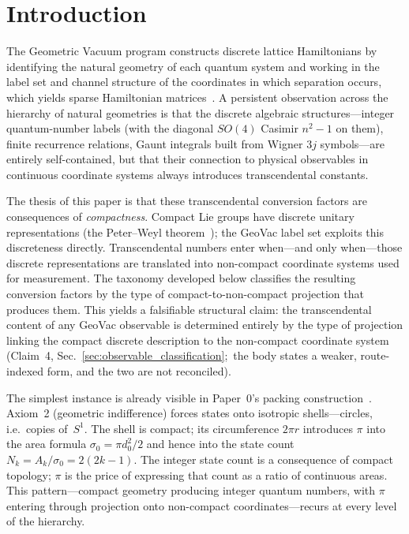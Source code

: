 \documentclass[aps,pra,twocolumn,superscriptaddress,longbibliography]{revtex4-2}
\begin{document}
\maketitle


\section{Introduction}
\label{sec:intro}

The Geometric Vacuum program constructs discrete lattice
Hamiltonians by identifying the natural geometry of each quantum
system and working in the label set and channel structure of the
coordinates in which separation occurs, which yields sparse Hamiltonian
matrices~\cite{loutey_paper0,loutey_paper1,loutey_paper7}.  A
persistent observation across the hierarchy of natural geometries
is that the discrete algebraic structures---integer quantum-number
labels (with the diagonal $SO(4)$ Casimir $n^2-1$ on them),
finite recurrence relations, Gaunt integrals built from Wigner
$3j$ symbols---are entirely self-contained, but that their
connection to physical observables in continuous coordinate
systems always introduces transcendental constants.

The thesis of this paper is that these transcendental conversion
factors are consequences of \emph{compactness}.  Compact Lie groups
have discrete unitary representations (the Peter--Weyl
theorem~\cite{peter_weyl1927}); the GeoVac label set exploits this
discreteness directly.  Transcendental numbers enter when---and only
when---those discrete representations are translated into non-compact
coordinate systems used for measurement.  The taxonomy developed below
classifies the resulting conversion factors by the type of
compact-to-non-compact projection that produces them.  This yields a
falsifiable structural claim: the transcendental content of any GeoVac
observable is determined entirely by the type of projection linking
the compact discrete description to the non-compact coordinate system
(Claim~4, Sec.~\ref{sec:observable_classification};\ the body states
a weaker, route-indexed form, and the two are not reconciled).

The simplest instance is already visible in Paper~0's packing
construction~\cite{loutey_paper0}.  Axiom~2 (geometric indifference)
forces states onto isotropic shells---circles, i.e.\ copies of~$S^1$.
The shell is compact; its circumference $2\pi r$ introduces $\pi$
into the area formula $\sigma_0 = \pi d_0^2/2$ and hence into the
state count $N_k = A_k / \sigma_0 = 2(2k-1)$.  The integer state count
is a consequence of compact topology; $\pi$ is the price of expressing
that count as a ratio of continuous areas.  This pattern---compact
geometry producing integer quantum numbers, with $\pi$ entering
through projection onto non-compact coordinates---recurs at every level
of the hierarchy.
\end{document}
